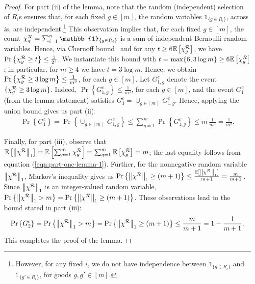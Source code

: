 \begin{proof}
For part (ii) of the lemma, note that the random (independent) selection of $R_i$s ensures that, for each fixed $g \in [m]$, the random variables $\mathbb{1}_{\{g \in R_i\}}$, across $i$s, are independent.\footnote{However, for any fixed $i$, we do not have independence between $\mathbb{1}_{\{g \in R_i\}}$ and $\mathbb{1}_{\{g' \in R_i\}}$, for goods $g,g' \in [m]$.} This observation implies that, for each fixed $g \in [m]$, the count $\chi^\calR_g = \sum_{i=1}^n \mathbb{1}_{\{g \in R_i\}}$ is a sum of independent Bernoulli random variables. Hence, via Chernoff bound~\cite[Theorem 4.4]{mitzenmacher2017probability} and for any $t \geq 6 \mathbb{E}\left[\chi^{\mathcal{R}}_g\right]$, we have $\Pr \left\{ \chi^{\mathcal{R}}_g \geq t \right\} \leq \frac{1}{2^t}$. We instantiate this bound with $t = \max\{ 6, 3 \log m\} \geq 6 \mathbb{E}\left[\chi^{\mathcal{R}}_g\right]$; in particular, for $m \geq 4$ we have $t = 3 \log m$. Hence, we obtain $\Pr \left\{ \chi^{\mathcal{R}}_g \geq 3 \log m \right\} \leq \frac{1}{m^3}$, for each $g \in [m]$. Let $G^c_{1,g}$ denote the event $\{\chi^{\mathcal{R}}_g \geq 3 \log m\}$. Indeed, $\Pr \left\{ G^c_{1,g} \right\} \leq \frac{1}{m^3}$, for each $g \in [m]$, and the event $G^c_1$ (from the lemma statement) satisfies $G^c_1 = \cup_{g \in [m]} \ G^c_{1,g}$. Hence, applying the union bound gives us part (ii):
\begin{align*}
    \Pr\left\{ G^c_1 \right\} =  \Pr\left\{ \cup_{g \in [m]} \ G^c_{1,g} \right\} \leq \sum_{g =1}^m \Pr \left\{ G^c_{1,g} \right\} \leq m \ \frac{1}{m^3} = \frac{1}{m^2}. 
\end{align*}

Finally, for part (iii), observe that $ \mathbb{E}\left[\left\|\chi^{\mathcal{R}}\right\|_1\right] = \mathbb{E}\left[\sum_{g=1}^m \chi^{\mathcal{R}}_g\right] = \sum_{g=1}^m \mathbb{E}\left[\chi^{\mathcal{R}}_g\right] = m$; the last equality follows from equation (\ref{eqn:part-one-lemma-1}). Further, for the nonnegative random variable $\left\|\chi^{\mathcal{R}}\right\|_1$, Markov's inequality gives us $\Pr\left\{ 
 \left\|\chi^{\mathcal{R}}\right\|_1 \geq (m+1) \right\} \leq \frac{\mathbb{E}\left[\left\|\chi^{\mathcal{R}}\right\|_1\right]}{m+1} = \frac{m}{m+1}$. Since $\left\|\chi^{\mathcal{R}}\right\|_1$ is an integer-valued random variable, $\Pr\left\{ \left\|\chi^{\mathcal{R}}\right\|_1 > m \right\} = \Pr\left\{ \left\|\chi^{\mathcal{R}}\right\|_1 \geq (m+1) \right\}$. These observations lead to the bound stated in part (iii):
 \begin{align*}
     \Pr\left\{ G_2^c \right\} = \Pr\left\{ \left\|\chi^{\mathcal{R}}\right\|_1 > m \right\} = \Pr\left\{ \left\|\chi^{\mathcal{R}}\right\|_1 \geq (m+1) \right\} \leq \frac{m}{m+1} = 1 - \frac{1}{m+1}.
 \end{align*}
This completes the proof of the lemma. 
\end{proof}

